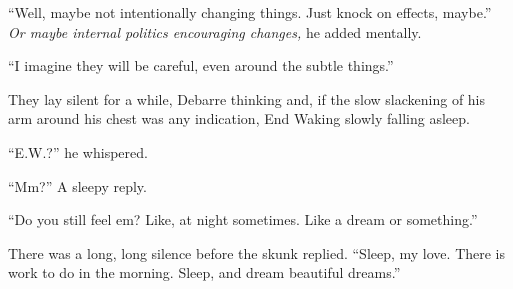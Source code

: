 ``Well, maybe not intentionally changing things. Just knock on effects, maybe.'' \emph{Or maybe internal politics encouraging changes,} he added mentally.

``I imagine they will be careful, even around the subtle things.''

They lay silent for a while, Debarre thinking and, if the slow slackening of his arm around his chest was any indication, End Waking slowly falling asleep.

``E.W.?'' he whispered.

``Mm?'' A sleepy reply.

``Do you still feel em? Like, at night sometimes. Like a dream or something.''

There was a long, long silence before the skunk replied. ``Sleep, my love. There is work to do in the morning. Sleep, and dream beautiful dreams.''
